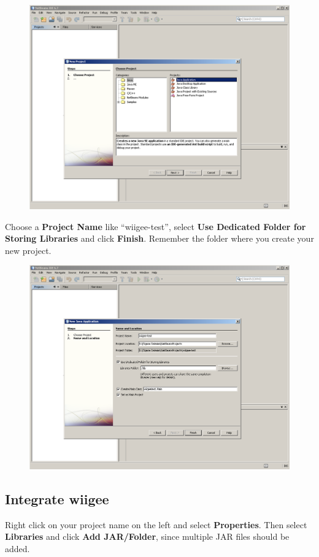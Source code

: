 \documentclass[%
   11pt,              %
   english,           %
   a4paper,           %
   DIV11,             %
   BCOR12mm,		  %
   titlepage,		  %
   bibtotoc,		  %
   liststotoc,		  %
   final,			  %
   twoside,			  %
   openright,		  %
   cleardoubleempty   %
]{scrreprt}%
\begin{document}
\begin{figure}[h!]
\centering
\includegraphics[width=0.95\linewidth]{img/setup/netbeans/step1.png}
\end{figure}

Choose a \textbf{Project Name} like "`wiigee-test"', select \textbf{Use Dedicated Folder for Storing Libraries} and click \textbf{Finish}. Remember the folder where you create your new project.

\begin{figure}[h!]
\centering
\includegraphics[width=0.95\linewidth]{img/setup/netbeans/step2.png}
\end{figure}

\subsection{Integrate wiigee}
Right click on your project name on the left and select \textbf{Properties}. Then select \textbf{Libraries} and click \textbf{Add JAR/Folder}, since multiple JAR files should be added.
\end{document}
